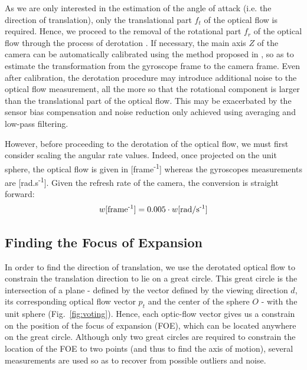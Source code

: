 As we are only interested in the estimation of the angle of attack (i.e. the direction of translation), only the translational part $f_t$ of the optical flow is required. Hence, we proceed to the removal of the rotational part $f_r$ of the optical flow through the process of derotation \cite{derotation}. If necessary, the main axis $Z$ of the camera can be automatically calibrated using the method proposed in \cite{autocalib}, so as to estimate the transformation from the gyroscope frame to the camera frame. Even after calibration, the derotation procedure may introduce additional noise to the optical flow measurement, all the more so that the rotational component is larger than the translational part of the optical flow. This may be exacerbated by the sensor bias compensation and noise reduction only achieved using averaging and low-pass filtering.

However, before proceeding to the derotation of the optical flow, we must first consider scaling the angular rate values. Indeed, once projected on the unit sphere, the optical flow is given in [frame\textsuperscript{-1}] whereas the gyroscopes measurements are [rad.s\textsuperscript{-1}]. Given the refresh rate of the camera, the conversion is straight forward: 
\begin{equation}
w\mathrm{[frame\textsuperscript{-1}]} = 0.005 \cdot w\mathrm{[rad/s\textsuperscript{-1}]}
\end{equation}

\subsection{Finding the Focus of Expansion}
In order to find the direction of translation, we use the derotated optical flow to constrain the translation direction to lie on a great circle. This great circle is the intersection of a plane - defined by the vector defined by the viewing direction $d$, its corresponding optical flow vector $p_t$ and the center of the sphere $O$ - with the unit sphere (Fig.~\ref{fig:voting}). Hence, each optic-flow vector gives us a constrain on the position of the focus of expansion (FOE), which can be located anywhere on the great circle. Although only two great circles are required to constrain the location of the FOE to two points (and thus to find the axis of motion), several measurements are used so as to recover from possible outliers and noise.

